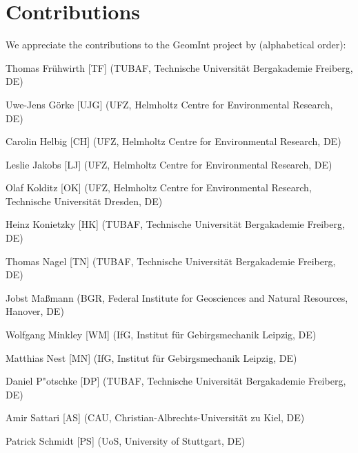 \chapter*{Contributions}

We appreciate the contributions to the GeomInt project by  (alphabetical order):

\begin{list}{-}{\leftmargin=1em \itemindent=0em \itemsep=0.1em}

\item Thomas Frühwirth [TF] (TUBAF, Technische Universität Bergakademie Freiberg, DE)	

\item Uwe-Jens Görke [UJG] (UFZ, Helmholtz Centre for Environmental Research, DE)	

\item Carolin Helbig [CH] (UFZ, Helmholtz Centre for Environmental Research, DE)	

\item Leslie Jakobs [LJ] (UFZ, Helmholtz Centre for Environmental Research, DE)	

\item Olaf Kolditz [OK] (UFZ, Helmholtz Centre for Environmental Research, Technische Universität Dresden, DE) 

\item Heinz Konietzky [HK] (TUBAF, Technische Universität Bergakademie Freiberg, DE)	

\item Thomas Nagel [TN] (TUBAF, Technische Universität Bergakademie Freiberg, DE) 

\item Jobst Ma{\ss}mann (BGR, Federal Institute for Geosciences and Natural Resources, Hanover, DE)

\item Wolfgang Minkley [WM] (IfG, Institut für Gebirgsmechanik Leipzig, DE)	

\item Matthias Nest [MN] (IfG, Institut für Gebirgsmechanik Leipzig, DE)	

\item Daniel P"otschke [DP] (TUBAF, Technische Universität Bergakademie Freiberg, DE)	

\item Amir Sattari [AS] (CAU, Christian-Albrechts-Universität zu Kiel, DE)	

\item Patrick Schmidt [PS] (UoS, University of Stuttgart, DE)	


\end{list}
